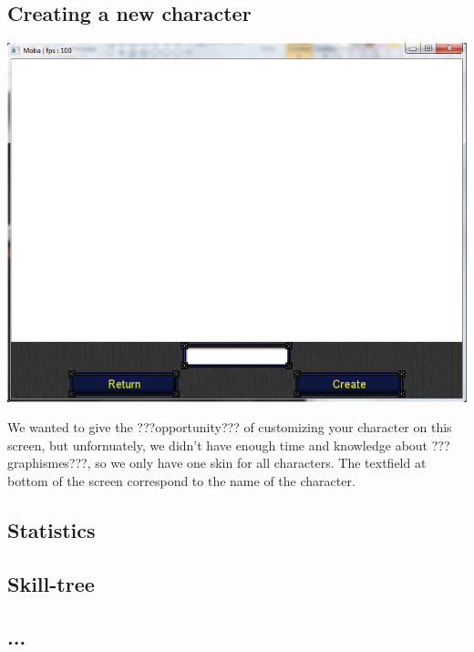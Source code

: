 \documentclass{scrreprt}
\begin{document}
		  \subsection{Creating a new character}
		  \begin{center}
		  \includegraphics[scale=0.4]{create_character.png}
		  \end{center}
		  We wanted to give the ???opportunity??? of customizing your character on this screen, but unfornuately, we didn't have enough time and knowledge about ???graphismes???, so we only have one skin for all characters. The textfield at bottom of the screen correspond to the name of the character.
		  \subsection{Statistics}
		  \subsection{Skill-tree}
		  \subsection{...}
\end{document}
